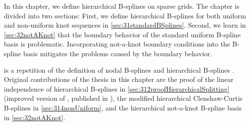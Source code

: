 In this chapter, we define hierarchical B-splines on sparse grids.
The chapter is divided into two sections:
First, we define hierarchical B-splines for both
uniform and non-uniform knot sequences in \cref{sec:31standardBSplines}.
Second, we learn in \cref{sec:32notAKnot} that the boundary behavior
of the standard uniform B-spline basis is problematic.
Incorporating not-a-knot boundary conditions into the B-spline basis
mitigates the problems caused by the boundary behavior.

 is a repetition of the definition
of nodal B-splines  and
hierarchical B-splines .
Original contributions of the thesis in this chapter are the proof of
the linear independence of hierarchical B-splines in
\cref{sec:312proofHierarchicalSplitting}
(improved version of \cite{Valentin14Hierarchische},
published in \cite{Valentin16Hierarchical}),
the modified hierarchical Clenshaw-Curtis B-splines in
\cref{sec:314nonUniform}, and
the hierarchical not-a-knot B-spline basis in \cref{sec:32notAKnot}.






\cleardoublepage
